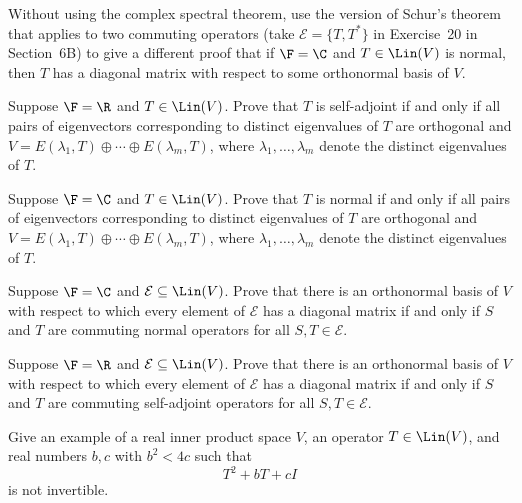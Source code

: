 \begin{exercise}
Without using the complex spectral theorem, use the version of Schur's theorem
that applies to two commuting operators (take $\mathcal{E}=\{T,T^*\}$ in
Exercise~20 in Section~6B) to give a different proof that if $\F=\C$ and
$T\in\Lin(V)$ is normal, then $T$ has a diagonal matrix with respect to some
orthonormal basis of $V$.
\end{exercise}

\begin{exercise}
Suppose $\F=\R$ and $T\in\Lin(V)$. Prove that $T$ is self-adjoint if and only
if all pairs of eigenvectors corresponding to distinct eigenvalues of $T$ are
orthogonal and $V=E(\lambda_1,T)\oplus\cdots\oplus E(\lambda_m,T)$, where
$\lambda_1,\dots,\lambda_m$ denote the distinct eigenvalues of $T$.
\end{exercise}

\begin{exercise}
Suppose $\F=\C$ and $T\in\Lin(V)$. Prove that $T$ is normal if and only if all
pairs of eigenvectors corresponding to distinct eigenvalues of $T$ are
orthogonal and $V=E(\lambda_1,T)\oplus\cdots\oplus E(\lambda_m,T)$, where
$\lambda_1,\dots,\lambda_m$ denote the distinct eigenvalues of $T$.
\end{exercise}

\begin{exercise}
Suppose $\F=\C$ and $\mathcal{E}\subseteq\Lin(V)$. Prove that there is an
orthonormal basis of $V$ with respect to which every element of $\mathcal{E}$
has a diagonal matrix if and only if $S$ and $T$ are commuting normal operators
for all $S,T\in\mathcal{E}$.
\end{exercise}

\begin{exercise}
Suppose $\F=\R$ and $\mathcal{E}\subseteq\Lin(V)$. Prove that there is an
orthonormal basis of $V$ with respect to which every element of $\mathcal{E}$
has a diagonal matrix if and only if $S$ and $T$ are commuting self-adjoint
operators for all $S,T\in\mathcal{E}$.
\end{exercise}

\begin{exercise}
Give an example of a real inner product space $V$, an operator $T\in\Lin(V)$,
and real numbers $b,c$ with $b^2<4c$ such that
\[ T^2+bT+cI \]
is not invertible.
\end{exercise}

